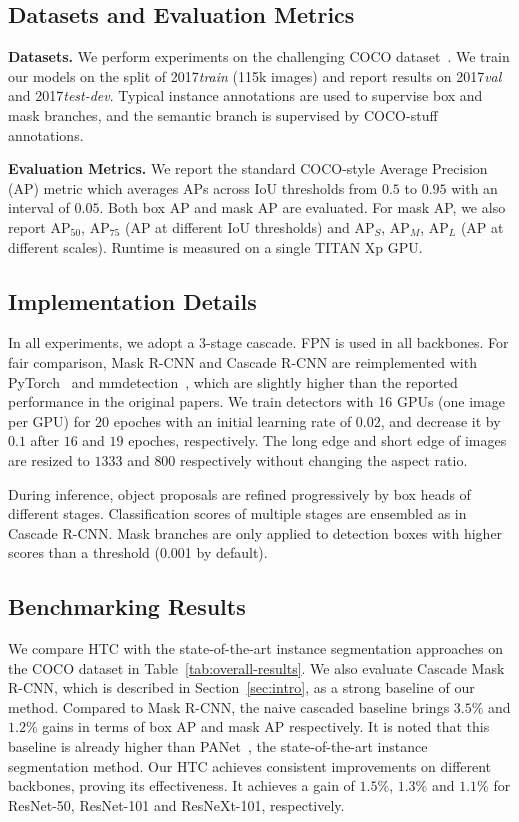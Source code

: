 \documentclass[10pt,twocolumn,letterpaper]{article}
\begin{document}
\subsection{Datasets and Evaluation Metrics}

\noindent
\textbf{Datasets.}
We perform experiments on the challenging COCO dataset~\cite{lin2014microsoft}.
We train our models on the split of 2017\emph{train} (115k images)
and report results on 2017\emph{val} and 2017\emph{test-dev}.
Typical instance annotations are used to supervise box and mask branches,
and the semantic branch is supervised by COCO-stuff~\cite{caesar2018cvpr} annotations.

\noindent
\textbf{Evaluation Metrics.}
We report the standard COCO-style Average Precision (AP) metric which averages APs across IoU thresholds from $0.5$ to $0.95$ with an interval of $0.05$.
Both box AP and mask AP are evaluated.
For mask AP, we also report $\text{AP}_{50}$, $\text{AP}_{75}$ (AP at different IoU thresholds)
and $\text{AP}_{S}$, $\text{AP}_{M}$, $\text{AP}_{L}$ (AP at different scales).
Runtime is measured on a single TITAN Xp GPU.

\subsection{Implementation Details}
In all experiments, we adopt a 3-stage cascade. FPN is used in all backbones.
For fair comparison, Mask R-CNN and Cascade R-CNN are reimplemented with PyTorch~\cite{paszke2017automatic} and mmdetection~\cite{mmdetection2018},
which are slightly higher than the reported performance in the original papers.
We train detectors with 16 GPUs (one image per GPU) for $20$ epoches with an initial learning rate of $0.02$,
and decrease it by $0.1$ after $16$ and $19$ epoches, respectively.
The long edge and short edge of images are resized to $1333$ and $800$ respectively without changing the aspect ratio.

During inference, object proposals are refined progressively by box heads of different stages.
Classification scores of multiple stages are ensembled as in Cascade R-CNN.
Mask branches are only applied to detection boxes with higher scores than a threshold (0.001 by default).

\subsection{Benchmarking Results}

We compare HTC with the state-of-the-art instance segmentation approaches on the COCO dataset in Table~\ref{tab:overall-results}.
We also evaluate Cascade Mask R-CNN, which is described in Section~\ref{sec:intro}, as a strong baseline of our method.
Compared to Mask R-CNN, the naive cascaded baseline brings $3.5\%$ and $1.2\%$ gains in terms of box AP and mask AP respectively.
It is noted that this baseline is already higher than PANet~\cite{liu2018path}, the state-of-the-art instance segmentation method.
Our HTC achieves consistent improvements on different backbones, proving its effectiveness.
It achieves a gain of $1.5\%$, $1.3\%$ and $1.1\%$ for ResNet-50, ResNet-101 and ResNeXt-101, respectively.
\end{document}
